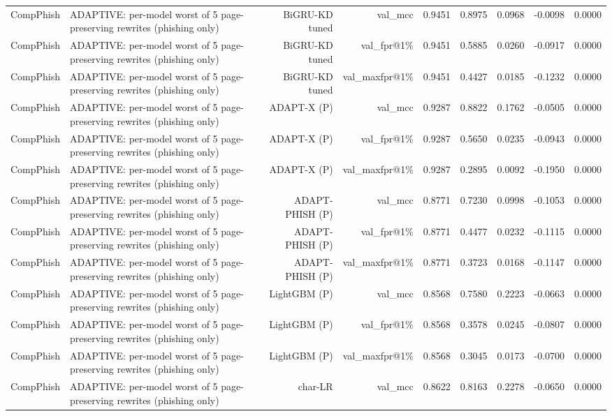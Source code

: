 \begin{table}[t]
\begin{tabular}{llrrrrrrr}
CompPhish & ADAPTIVE: per-model worst of 5 page-preserving rewrites (phishing only) & BiGRU-KD tuned & val\_mcc & 0.9451 & 0.8975 & 0.0968 & -0.0098 & 0.0000 \\
CompPhish & ADAPTIVE: per-model worst of 5 page-preserving rewrites (phishing only) & BiGRU-KD tuned & val\_fpr@1\% & 0.9451 & 0.5885 & 0.0260 & -0.0917 & 0.0000 \\
CompPhish & ADAPTIVE: per-model worst of 5 page-preserving rewrites (phishing only) & BiGRU-KD tuned & val\_maxfpr@1\% & 0.9451 & 0.4427 & 0.0185 & -0.1232 & 0.0000 \\
CompPhish & ADAPTIVE: per-model worst of 5 page-preserving rewrites (phishing only) & ADAPT-X (P) & val\_mcc & 0.9287 & 0.8822 & 0.1762 & -0.0505 & 0.0000 \\
CompPhish & ADAPTIVE: per-model worst of 5 page-preserving rewrites (phishing only) & ADAPT-X (P) & val\_fpr@1\% & 0.9287 & 0.5650 & 0.0235 & -0.0943 & 0.0000 \\
CompPhish & ADAPTIVE: per-model worst of 5 page-preserving rewrites (phishing only) & ADAPT-X (P) & val\_maxfpr@1\% & 0.9287 & 0.2895 & 0.0092 & -0.1950 & 0.0000 \\
CompPhish & ADAPTIVE: per-model worst of 5 page-preserving rewrites (phishing only) & ADAPT-PHISH (P) & val\_mcc & 0.8771 & 0.7230 & 0.0998 & -0.1053 & 0.0000 \\
CompPhish & ADAPTIVE: per-model worst of 5 page-preserving rewrites (phishing only) & ADAPT-PHISH (P) & val\_fpr@1\% & 0.8771 & 0.4477 & 0.0232 & -0.1115 & 0.0000 \\
CompPhish & ADAPTIVE: per-model worst of 5 page-preserving rewrites (phishing only) & ADAPT-PHISH (P) & val\_maxfpr@1\% & 0.8771 & 0.3723 & 0.0168 & -0.1147 & 0.0000 \\
CompPhish & ADAPTIVE: per-model worst of 5 page-preserving rewrites (phishing only) & LightGBM (P) & val\_mcc & 0.8568 & 0.7580 & 0.2223 & -0.0663 & 0.0000 \\
CompPhish & ADAPTIVE: per-model worst of 5 page-preserving rewrites (phishing only) & LightGBM (P) & val\_fpr@1\% & 0.8568 & 0.3578 & 0.0245 & -0.0807 & 0.0000 \\
CompPhish & ADAPTIVE: per-model worst of 5 page-preserving rewrites (phishing only) & LightGBM (P) & val\_maxfpr@1\% & 0.8568 & 0.3045 & 0.0173 & -0.0700 & 0.0000 \\
CompPhish & ADAPTIVE: per-model worst of 5 page-preserving rewrites (phishing only) & char-LR & val\_mcc & 0.8622 & 0.8163 & 0.2278 & -0.0650 & 0.0000 \\

\end{tabular}
\end{table}
